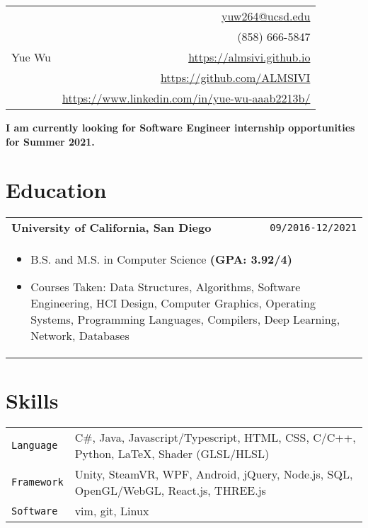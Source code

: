 \documentclass[10pt, letterpaper]{article}
\newcommand{\itemcols}[1]{
\multicolumn{2}{p{\dimexpr \linewidth-2\tabcolsep}}{
\begin{itemize}
#1
\end{itemize}
}
}
\begin{document}
\noindent
\begin{tabularx}{\linewidth}{X r}
\multirow{5}{*}{{\fontsize{50}{60}\selectfont Yue Wu}}
& \href{mailto:yuw264@ucsd.edu}{yuw264@ucsd.edu} \\
& (858) 666-5847 \\
& \href{https://almsivi.github.io}{https://almsivi.github.io} \\
& \href{https://github.com/ALMSIVI}{https://github.com/ALMSIVI} \\
& \href{https://www.linkedin.com/in/yue-wu-aaab2213b/}{https://www.linkedin.com/in/yue-wu-aaab2213b/}
\end{tabularx}
\noindent
\textbf{I am currently looking for Software Engineer internship opportunities for Summer 2021.}
\section{Education}
\smallskip
\noindent
\begin{tabularx}{\linewidth}{X r}
\textbf{\large University of California, San Diego} & \texttt{09/2016-12/2021} \\
\itemcols{
\item B.S. and M.S. in Computer Science \textbf{(GPA: 3.92/4)}
\item Courses Taken: Data Structures, Algorithms, Software Engineering, HCI Design, Computer Graphics, Operating Systems, Programming Languages, Compilers, Deep Learning, Network, Databases
}
\end{tabularx}
\section{Skills}
\smallskip
\noindent
\begin{tabularx}{\linewidth}{l X}
\texttt{Language} & C\#, Java, Javascript/Typescript, HTML, CSS, C/C++, Python, \LaTeX, Shader (GLSL/HLSL) \\
\texttt{Framework} & Unity, SteamVR, WPF, Android, jQuery, Node.js, SQL, OpenGL/WebGL, React.js, THREE.js \\
\texttt{Software} & vim, git, Linux
\end{tabularx}
\end{document}
